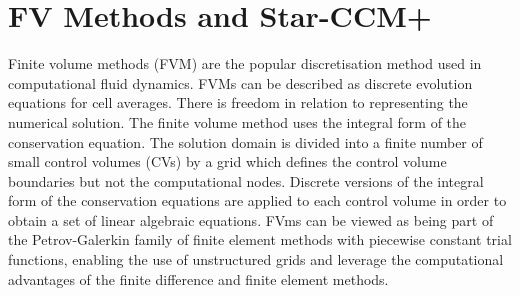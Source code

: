 \section{FV Methods and Star-CCM+}
Finite volume methods (FVM) are the popular discretisation method used in computational fluid dynamics. FVMs can be described 
as discrete evolution equations for cell averages. There is freedom in relation to representing the numerical solution.
The finite volume method uses the integral form of the conservation equation. The solution domain is divided into a finite number of small control volumes (CVs)
by a grid which defines the control volume boundaries but not the computational nodes. Discrete versions of the integral form of the conservation 
equations are applied to each control volume in order to obtain a set of linear algebraic equations. FVms can be viewed as being part
of the Petrov-Galerkin family of finite element methods with piecewise constant trial functions, enabling the use of 
unstructured grids and leverage the computational advantages of the finite difference and finite element methods.

